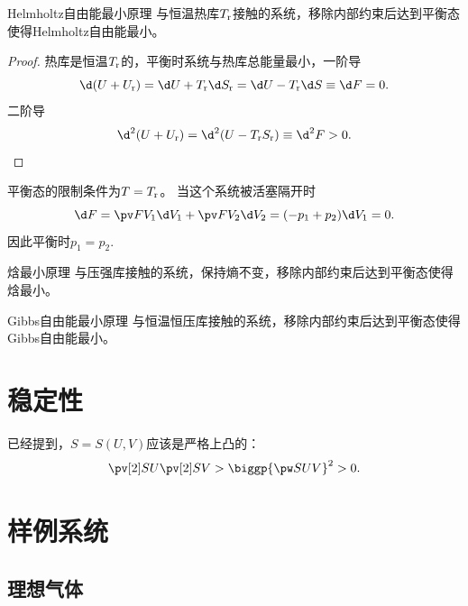\begin{theorem}
	{Helmholtz自由能最小原理}{}
	与恒温热库$T_{\mathrm r}$接触的系统，移除内部约束后达到平衡态使得Helmholtz自由能最小。
\end{theorem}

\begin{proof}
	热库是恒温$T_{\mathrm r}$的，平衡时系统与热库总能量最小，一阶导
	\[
		\d(U+U\rev)=\d U+T\rev\d S\rev=\d U-T\rev\d S\equiv\d F=0.
	\]
	二阶导
	\[
		\d^2(U+U\rev)=\d^2(U-T\rev S\rev)\equiv\d^2F>0.\qedhere
	\]
	
\end{proof}

\begin{corollary}
	平衡态的限制条件为$T=T_{\mathrm r}$。
	当这个系统被活塞隔开时
	\[
		\d F=\pv F{V_1}\d V_1+\pv F{V_2}\d V_2=(-p_1+p_2)\d V_1=0.
	\]
	因此平衡时$p_1=p_2.$
\end{corollary}

\begin{theorem}
	{焓最小原理}{}
	与压强库接触的系统，保持熵不变，移除内部约束后达到平衡态使得焓最小。
\end{theorem}

\begin{theorem}
	{Gibbs自由能最小原理}{}
	与恒温恒压库接触的系统，移除内部约束后达到平衡态使得Gibbs自由能最小。
\end{theorem}

\section{稳定性}

已经提到，$S=S(U,V)$应该是严格上凸的：
\begin{equation}
	\pv[2]SU\pv[2]SV>\biggp{\pw SUV}^2>0.
\end{equation}

\section{样例系统}

\subsection{理想气体}

